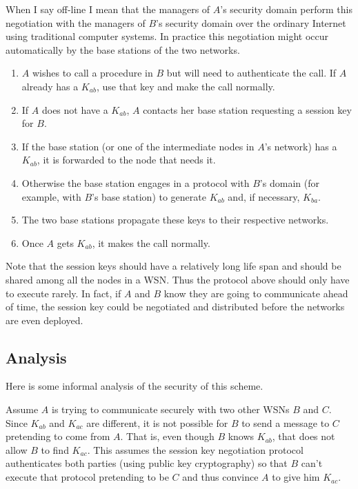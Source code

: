 \documentclass{article}
\begin{document}
When I say off-line I mean that the managers of $A$'s security domain perform this negotiation
with the managers of $B$'s security domain over the ordinary Internet using traditional computer
systems. In practice this negotiation might occur automatically by the base stations of the two
networks.
\begin{enumerate}
\item $A$ wishes to call a procedure in $B$ but will need to authenticate the call. If $A$
  already has a $K_{ab}$, use that key and make the call normally.
\item If $A$ does not have a $K_{ab}$, $A$ contacts her base station requesting a session key
  for $B$.
\item If the base station (or one of the intermediate nodes in $A$'s network) has a $K_{ab}$, it
  is forwarded to the node that needs it.
\item Otherwise the base station engages in a protocol with $B$'s domain (for example, with
  $B$'s base station) to generate $K_{ab}$ and, if necessary, $K_{ba}$.
\item The two base stations propagate these keys to their respective networks.
\item Once $A$ gets $K_{ab}$, it makes the call normally.
\end{enumerate}

Note that the session keys should have a relatively long life span and should be shared among
all the nodes in a WSN. Thus the protocol above should only have to execute rarely. In fact, if
$A$ and $B$ know they are going to communicate ahead of time, the session key could be
negotiated and distributed before the networks are even deployed.

\subsection{Analysis}

Here is some informal analysis of the security of this scheme.

Assume $A$ is trying to communicate securely with two other WSNs $B$ and $C$. Since $K_{ab}$ and
$K_{ac}$ are different, it is not possible for $B$ to send a message to $C$ pretending to come
from $A$. That is, even though $B$ knows $K_{ab}$, that does not allow $B$ to find $K_{ac}$.
This assumes the session key negotiation protocol authenticates both parties (using public key
cryptography) so that $B$ can't execute that protocol pretending to be $C$ and thus convince $A$
to give him $K_{ac}$.
\end{document}
